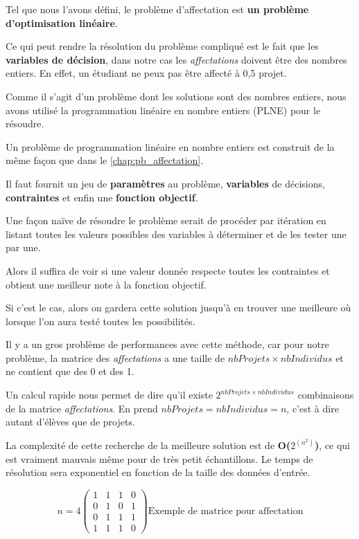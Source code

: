 \documentclass[final,poster]{polytech/polytech}
\begin{document}
Tel que nous l'avons défini, le problème d'affectation est \textbf{un problème d'optimisation linéaire}. 

Ce qui peut rendre la résolution du problème compliqué est le fait que les \textbf{variables de décision}, dans notre cas les \textit{affectations} doivent être des nombres entiers. En effet, un étudiant ne peux pas être affecté à 0,5 projet.

Comme il s'agit d'un problème dont les solutions sont des nombres entiers, nous avons utilisé la programmation linéaire en nombre entiers (PLNE) pour le résoudre. 

Un problème de programmation linéaire en nombre entiers est construit de la même façon que dans le \autoref{chap:pb_affectation}. 

Il faut fournit un jeu de \textbf{paramètres} au problème, \textbf{variables} de décisions, \textbf{contraintes} et enfin une \textbf{fonction objectif}.


Une façon naïve de résoudre le problème serait de procéder par itération en listant toutes les valeurs possibles des variables à déterminer et de les tester une par une. 

Alors il suffira de voir si une valeur donnée respecte toutes les contraintes et obtient une meilleur note à la fonction objectif.

 Si c'est le cas, alors on gardera cette solution jusqu'à en trouver une meilleure où lorsque l'on aura testé toutes les possibilités.

Il y a un gros problème de performances avec cette méthode, car pour notre problème, la matrice des \textit{affectations} a une taille de $nbProjets\times nbIndividus$ et ne contient que des 0 et des 1.

Un calcul rapide nous permet de dire qu'il existe $2^{nbProjets\times nbIndividus}$ combinaisons de la matrice \textit{affectations}.
En prend $nbProjets=nbIndividus=n$, c'est à dire autant d'élèves que de projets.

La complexité de cette recherche de la meilleure solution est de \textbf{O($2^{(n^2)}$)}, ce qui est vraiment mauvais même pour de très petit échantillons. Le temps de résolution sera exponentiel en fonction de la taille des données d'entrée.

\begin{equation}
n=4
\left(
\begin{array}{cccc}
1 & 1 & 1 & 0 \\ 
0 & 1 & 0 & 1 \\ 
0 & 1 & 1 & 1 \\ 
1 & 1 & 1 & 0
\end{array} 
\right)
\text{Exemple de matrice pour affectation}
\end{equation}
\end{document}
